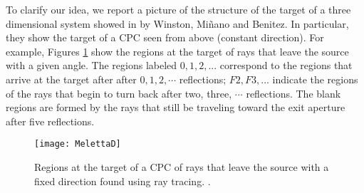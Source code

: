 To clarify our idea, we report a picture of the structure of the target of a three dimensional system showed in \cite{winston2005nonimaging} by Winston, Mi\~nano and Benitez.
In particular, they show the target of a CPC seen from above (constant direction). For example, Figures \ref{fig:melettaC} show the regions at the target of rays that leave the source with a given angle. The regions labeled $0, 1, 2,$... correspond to the regions that arrive at the target after after $0, 1, 2, \cdots$ reflections; $F2, F3,$... indicate the regions of the rays that begin to turn back after two, three, $\cdots$ reflections. The blank regions are formed by the rays that
still be traveling toward the exit aperture after five reflections. 
\begin{figure}[h]
\centering
    \texttt{[image: MelettaD]}
    \caption{Regions at the target of a CPC of rays that leave the source with a fixed direction found using ray tracing. \cite{winston2005nonimaging}.}
\label{fig:melettaC}
\end{figure}
